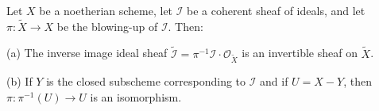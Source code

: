 Let $X$ be a noetherian scheme, let $\mathcal{I}$ be a coherent sheaf of ideals, and let $\pi: \tilde{X} \to X$ be the blowing-up of $\mathcal{I}$. Then:

(a) The inverse image ideal sheaf $\tilde{\mathcal{I}} = \pi^{-1}\mathcal{I} \cdot \mathcal{O}_{\tilde{X}}$ is an invertible sheaf on $\tilde{X}$.

(b) If $Y$ is the closed subscheme corresponding to $\mathcal{I}$ and if $U = X - Y$, then $\pi: \pi^{-1}(U) \to U$ is an isomorphism.
